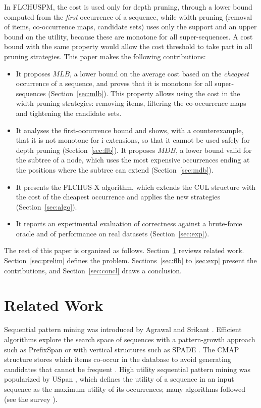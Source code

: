 \documentclass[runningheads]{llncs}
\newcommand{\FL}{\textsc{FLCHUSPM}}
\newcommand{\FX}{\textsc{FLCHUS-X}}
\newcommand{\mlb}{\ensuremath{\mathit{MLB}}}
\newcommand{\mdb}{\ensuremath{\mathit{MDB}}}
\begin{document}
In \FL{}, the cost is used only for depth pruning, through a lower bound computed from the
\emph{first} occurrence of a sequence, while width pruning (removal of items, co-occurrence maps,
candidate sets) uses only the support and an upper bound on the utility, because these are
monotone for all super-sequences. A cost bound with the same property would allow the cost
threshold to take part in all pruning strategies. This paper makes the following
contributions:
\begin{itemize}
\item It proposes \mlb, a lower bound on the average cost based on the \emph{cheapest}
  occurrence of a sequence, and proves that it is monotone for all super-sequences
  (Section~\ref{sec:mlb}). This property allows using the cost in the width pruning strategies:
  removing items, filtering the co-occurrence maps and tightening the candidate sets.
\item It analyses the first-occurrence bound and shows, with a counterexample, that it is not
  monotone for i-extensions, so that it cannot be used safely for depth pruning
  (Section~\ref{sec:flb}). It proposes \mdb, a lower bound valid for the subtree of a node, which
  uses the most expensive occurrences ending at the positions where the subtree can extend
  (Section~\ref{sec:mdb}).
\item It presents the \FX{} algorithm, which extends the CUL structure with the cost of the
  cheapest occurrence and applies the new strategies (Section~\ref{sec:algo}).
\item It reports an experimental evaluation of correctness against a brute-force oracle and of
  performance on real datasets (Section~\ref{sec:exp}).
\end{itemize}
The rest of this paper is organized as follows. Section~\ref{sec:related} reviews related work.
Section~\ref{sec:prelim} defines the problem. Sections~\ref{sec:flb} to \ref{sec:exp} present
the contributions, and Section~\ref{sec:concl} draws a conclusion.

\section{Related Work}\label{sec:related}

Sequential pattern mining was introduced by Agrawal and Srikant \cite{agrawal1995}. Efficient
algorithms explore the search space of sequences with a pattern-growth approach such as
PrefixSpan \cite{pei2004} or with vertical structures such as SPADE \cite{zaki2001}. The CMAP
structure stores which items co-occur in the database to avoid generating candidates that
cannot be frequent \cite{fournier2014cmap}. High utility sequential pattern mining was
popularized by USpan \cite{yin2012uspan}, which defines the utility of a sequence in an input
sequence as the maximum utility of its occurrences; many algorithms followed (see the survey
\cite{gan2021survey}).
\end{document}
